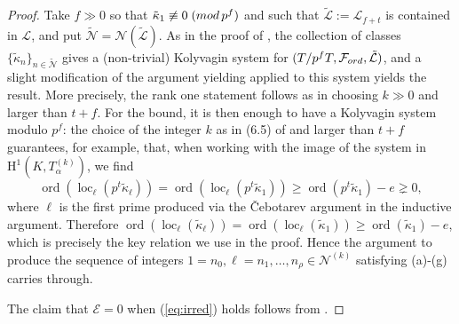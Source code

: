 \documentclass[10pt,reqno]{amsart}
\numberwithin{equation}{section}
\theoremstyle{plain}
\theoremstyle{definition}
\theoremstyle{definition}
\theoremstyle{plain}
\theoremstyle{plain}
\theoremstyle{plain}
\theoremstyle{plain}
\theoremstyle{plain}
\theoremstyle{plain}
\DeclareMathOperator{\ord}{ord}
\DeclareMathOperator{\loc}{loc}
\newcommand{\Fcal}{\mathcal{F}}
\newcommand{\cL}{\mathcal{L}}
\newcommand{\rH}{\mathrm{H}}
\begin{document}
\begin{proof}
Take $f\gg 0$ so that $\tilde{\kappa}_1\not\equiv 0\;({\rm mod}\,p^f)$ and  such that $\tilde{\mathcal{L}}:=\mathcal{L}_{f+t}$ is contained in $\mathcal{L}$, and put $\tilde{\mathcal{N}}=\mathcal{N}(\tilde{\mathcal{L}})$. As in the proof of \cite[Thm.~2.2.2]{howard-gl2-type}, the collection of classes $\{\tilde{\kappa}_n\}_{n\in\tilde{\mathcal{N}}}$ gives a (non-trivial) Kolyvagin system for $(T/p^fT,\mathcal{F}_{\rm ord},\tilde{\mathcal{L}})$, and a slight modification of the argument yielding \cite[Thm.~6.1.1]{eisenstein_cyc} applied to this system 
yields the result. More precisely, the rank one statement follows as in \cite[Thm 3.3.8]{eisenstein} choosing $k\gg 0$ and larger than $t+f$. For the bound, it is then enough to have a Kolyvagin system modulo $p^f$: the choice of the integer $k$ as in (6.5) of \cite{eisenstein_cyc} and larger than $t+f$ guarantees, for example, that, when working with the image of the system in $\rH^1(K, T^{(k)}_{\alpha})$, we find
\[
\ord(\loc_{\ell}(p^t\tilde{\kappa}_\ell))=\ord(\loc_{\ell}(p^t\tilde{\kappa}_1))\geq \ord(p^t\tilde{\kappa}_1) -  e \gneq 0,
\] 
where $\ell$ is the first prime produced via the \v{C}ebotarev argument in the inductive argument.
Therefore $\ord(\loc_{\ell}(\tilde{\kappa}_\ell))=\ord(\loc_{\ell}(\tilde{\kappa}_1)) \geq  \ord(\tilde{\kappa}_1) -  e$, which is precisely the key relation we use in the proof. Hence the argument to produce the sequence of integers $1=n_0, \ell=n_1, \dots, n_\rho \in \mathcal{N}^{(k)}$ satisfying (a)-(g) carries through.

The claim that $\mathcal{E}=0$ when (\ref{eq:irred}) holds follows from \cite[Rem.~3.3.5]{eisenstein}.
%
\end{proof}
\end{document}
